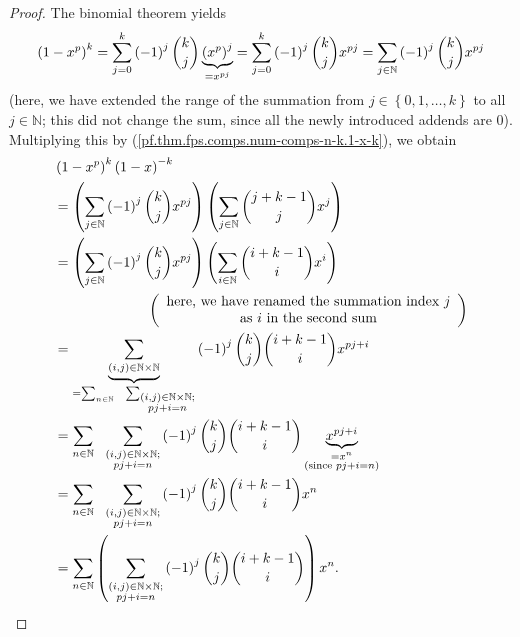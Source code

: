 \begin{proof}
The binomial theorem yields%
\[
\left(  1-x^{p}\right)  ^{k}=\sum_{j=0}^{k}\left(  -1\right)  ^{j}\dbinom
{k}{j}\underbrace{\left(  x^{p}\right)  ^{j}}_{=x^{pj}}=\sum_{j=0}^{k}\left(
-1\right)  ^{j}\dbinom{k}{j}x^{pj}=\sum_{j\in\mathbb{N}}\left(  -1\right)
^{j}\dbinom{k}{j}x^{pj}%
\]
(here, we have extended the range of the summation from $j\in\left\{
0,1,\ldots,k\right\}  $ to all $j\in\mathbb{N}$; this did not change the sum,
since all the newly introduced addends are $0$). Multiplying this by
(\ref{pf.thm.fps.comps.num-comps-n-k.1-x-k}), we obtain%
\begin{align*}
&  \left(  1-x^{p}\right)  ^{k}\left(  1-x\right)  ^{-k}\\
&  =\left(  \sum_{j\in\mathbb{N}}\left(  -1\right)  ^{j}\dbinom{k}{j}%
x^{pj}\right)  \left(  \sum_{j\in\mathbb{N}}\dbinom{j+k-1}{j}x^{j}\right) \\
&  =\left(  \sum_{j\in\mathbb{N}}\left(  -1\right)  ^{j}\dbinom{k}{j}%
x^{pj}\right)  \left(  \sum_{i\in\mathbb{N}}\dbinom{i+k-1}{i}x^{i}\right) \\
&  \ \ \ \ \ \ \ \ \ \ \ \ \ \ \ \ \ \ \ \ \left(
\begin{array}
[c]{c}%
\text{here, we have renamed the summation index }j\\
\text{as }i\text{ in the second sum}%
\end{array}
\right) \\
&  =\underbrace{\sum_{\left(  i,j\right)  \in\mathbb{N}\times\mathbb{N}}%
}_{=\sum_{n\in\mathbb{N}}\ \ \sum_{\substack{\left(  i,j\right)  \in
\mathbb{N}\times\mathbb{N};\\pj+i=n}}}\left(  -1\right)  ^{j}\dbinom{k}%
{j}\dbinom{i+k-1}{i}x^{pj+i}\\
&  =\sum_{n\in\mathbb{N}}\ \ \sum_{\substack{\left(  i,j\right)  \in
\mathbb{N}\times\mathbb{N};\\pj+i=n}}\left(  -1\right)  ^{j}\dbinom{k}%
{j}\dbinom{i+k-1}{i}\underbrace{x^{pj+i}}_{\substack{=x^{n}\\\text{(since
}pj+i=n\text{)}}}\\
&  =\sum_{n\in\mathbb{N}}\ \ \sum_{\substack{\left(  i,j\right)  \in
\mathbb{N}\times\mathbb{N};\\pj+i=n}}\left(  -1\right)  ^{j}\dbinom{k}%
{j}\dbinom{i+k-1}{i}x^{n}\\
&  =\sum_{n\in\mathbb{N}}\left(  \sum_{\substack{\left(  i,j\right)
\in\mathbb{N}\times\mathbb{N};\\pj+i=n}}\left(  -1\right)  ^{j}\dbinom{k}%
{j}\dbinom{i+k-1}{i}\right)  x^{n}.
\end{align*}

\end{proof}
